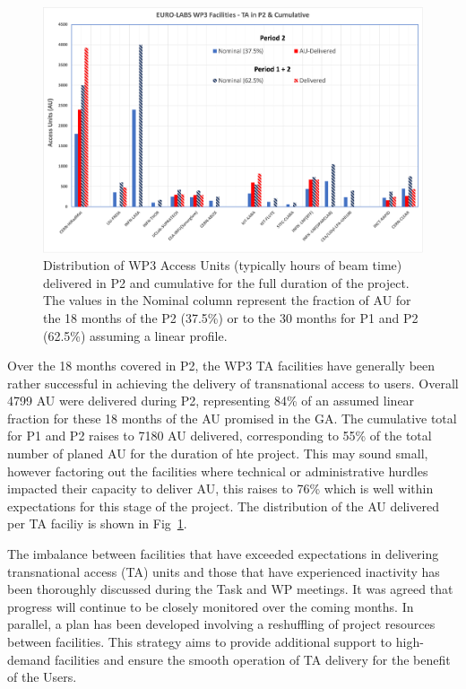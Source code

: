 \begin{figure}[!h]
    \centering
    \includegraphics[width=0.98\linewidth]{graphics/WP3-TAstatistics-1.png}
    \caption{Distribution of WP3 Access Units (typically hours of beam time) delivered in P2 and cumulative for the full duration of the project. The values in the Nominal column represent the fraction of AU for the 18 months of the P2 (37.5\%) or to the 30 months for P1 and P2 (62.5\%) assuming a linear profile.}
    \label{fig:wpe-taunits}
\end{figure}
Over the 18 months covered in P2, the WP3 TA facilities have generally been rather successful in achieving the delivery of transnational access to users. Overall 4799 AU were delivered during P2, representing 84\% of an assumed linear fraction for these 18 months of the AU promised in the GA. The cumulative total for P1 and P2 raises to 7180 AU delivered, corresponding to 55\% of the total number of planed AU for the duration of hte project. This may sound small, however factoring out the facilities where technical or administrative hurdles impacted their capacity to deliver AU, this raises to 76\% which is well within expectations for this stage of the project. The distribution of the AU delivered per TA faciliy is shown in Fig~\ref{fig:wpe-taunits}.

The imbalance between facilities that have exceeded expectations in delivering transnational access (TA) units and those that have experienced inactivity has been thoroughly discussed during the Task and WP meetings. It was agreed that progress will continue to be closely monitored over the coming months. In parallel, a plan has been developed involving a reshuffling of project resources between facilities. This strategy aims to provide additional support to high-demand facilities and ensure the smooth operation of TA delivery for the benefit of the Users.


